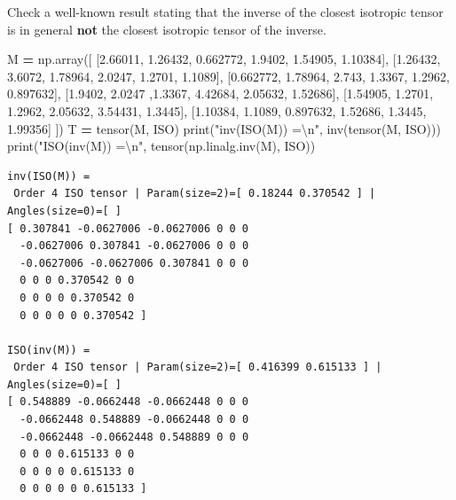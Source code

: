 \documentclass[
  a4paper,
  numbers=noendperiod,
  DIV=12]{scrreprt}
\newenvironment{Shaded}{\begin{snugshade}}{\end{snugshade}}
\newcommand{\BuiltInTok}[1]{#1}
\newcommand{\CharTok}[1]{\textcolor[rgb]{0.31,0.60,0.02}{#1}}
\newcommand{\FloatTok}[1]{\textcolor[rgb]{0.00,0.00,0.81}{#1}}
\newcommand{\NormalTok}[1]{#1}
\newcommand{\OperatorTok}[1]{\textcolor[rgb]{0.81,0.36,0.00}{\textbf{#1}}}
\newcommand{\StringTok}[1]{\textcolor[rgb]{0.31,0.60,0.02}{#1}}
\begin{document}
Check a well-known result stating that the inverse of the closest
isotropic tensor is in general \textbf{not} the closest isotropic tensor
of the inverse.

\begin{Shaded}
\begin{Highlighting}[]
\NormalTok{M }\OperatorTok{=}\NormalTok{ np.array([ [}\FloatTok{2.66011}\NormalTok{, }\FloatTok{1.26432}\NormalTok{, }\FloatTok{0.662772}\NormalTok{, }\FloatTok{1.9402}\NormalTok{, }\FloatTok{1.54905}\NormalTok{, }\FloatTok{1.10384}\NormalTok{],}
\NormalTok{               [}\FloatTok{1.26432}\NormalTok{, }\FloatTok{3.6072}\NormalTok{, }\FloatTok{1.78964}\NormalTok{, }\FloatTok{2.0247}\NormalTok{, }\FloatTok{1.2701}\NormalTok{, }\FloatTok{1.1089}\NormalTok{], }
\NormalTok{               [}\FloatTok{0.662772}\NormalTok{, }\FloatTok{1.78964}\NormalTok{, }\FloatTok{2.743}\NormalTok{, }\FloatTok{1.3367}\NormalTok{, }\FloatTok{1.2962}\NormalTok{, }\FloatTok{0.897632}\NormalTok{], }
\NormalTok{               [}\FloatTok{1.9402}\NormalTok{, }\FloatTok{2.0247}\NormalTok{ ,}\FloatTok{1.3367}\NormalTok{, }\FloatTok{4.42684}\NormalTok{, }\FloatTok{2.05632}\NormalTok{, }\FloatTok{1.52686}\NormalTok{], }
\NormalTok{               [}\FloatTok{1.54905}\NormalTok{, }\FloatTok{1.2701}\NormalTok{, }\FloatTok{1.2962}\NormalTok{, }\FloatTok{2.05632}\NormalTok{, }\FloatTok{3.54431}\NormalTok{, }\FloatTok{1.3445}\NormalTok{], }
\NormalTok{               [}\FloatTok{1.10384}\NormalTok{, }\FloatTok{1.1089}\NormalTok{, }\FloatTok{0.897632}\NormalTok{, }\FloatTok{1.52686}\NormalTok{, }\FloatTok{1.3445}\NormalTok{, }\FloatTok{1.99356}\NormalTok{] ])}
\NormalTok{T }\OperatorTok{=}\NormalTok{ tensor(M, ISO)}
\BuiltInTok{print}\NormalTok{(}\StringTok{"inv(ISO(M)) =}\CharTok{\textbackslash{}n}\StringTok{"}\NormalTok{, inv(tensor(M, ISO)))}
\BuiltInTok{print}\NormalTok{(}\StringTok{"ISO(inv(M)) =}\CharTok{\textbackslash{}n}\StringTok{"}\NormalTok{, tensor(np.linalg.inv(M), ISO))}
\end{Highlighting}
\end{Shaded}

\begin{verbatim}
inv(ISO(M)) =
 Order 4 ISO tensor | Param(size=2)=[ 0.18244 0.370542 ] | Angles(size=0)=[ ]
[ 0.307841 -0.0627006 -0.0627006 0 0 0 
  -0.0627006 0.307841 -0.0627006 0 0 0 
  -0.0627006 -0.0627006 0.307841 0 0 0 
  0 0 0 0.370542 0 0 
  0 0 0 0 0.370542 0 
  0 0 0 0 0 0.370542 ]

ISO(inv(M)) =
 Order 4 ISO tensor | Param(size=2)=[ 0.416399 0.615133 ] | Angles(size=0)=[ ]
[ 0.548889 -0.0662448 -0.0662448 0 0 0 
  -0.0662448 0.548889 -0.0662448 0 0 0 
  -0.0662448 -0.0662448 0.548889 0 0 0 
  0 0 0 0.615133 0 0 
  0 0 0 0 0.615133 0 
  0 0 0 0 0 0.615133 ]
\end{verbatim}
\end{document}
